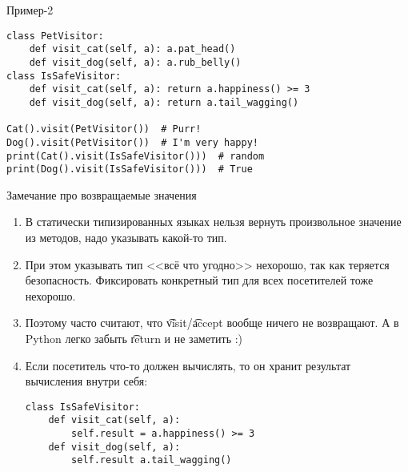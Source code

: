 \begin{frame}[fragile]{Пример-2}
\begin{verbatim}
class PetVisitor:
    def visit_cat(self, a): a.pat_head()
    def visit_dog(self, a): a.rub_belly()
class IsSafeVisitor:
    def visit_cat(self, a): return a.happiness() >= 3
    def visit_dog(self, a): return a.tail_wagging()

Cat().visit(PetVisitor())  # Purr!
Dog().visit(PetVisitor())  # I'm very happy!
print(Cat().visit(IsSafeVisitor()))  # random
print(Dog().visit(IsSafeVisitor()))  # True
\end{verbatim}
\end{frame}

\begin{frame}[fragile]{Замечание про возвращаемые значения}
	\begin{enumerate}
		\item
			В статически типизированных языках нельзя вернуть произвольное значение из методов,
			надо указывать какой-то тип.
		\item
			При этом указывать тип <<всё что угодно>> нехорошо, так как теряется безопасность.
			Фиксировать конкретный тип для всех посетителей тоже нехорошо.
		\item
			Поэтому часто считают, что \t{visit}/\t{accept} вообще ничего не возвращают.
			А в Python легко забыть \t{return} и не заметить :)
		\item
			Если посетитель что-то должен вычислять, то он хранит результат вычисления внутри себя:
\begin{verbatim}
class IsSafeVisitor:
    def visit_cat(self, a):
        self.result = a.happiness() >= 3
    def visit_dog(self, a):
        self.result a.tail_wagging()
\end{verbatim}
	\end{enumerate}
\end{frame}
